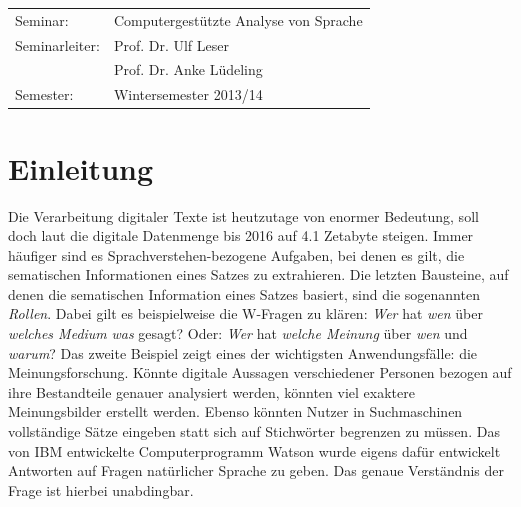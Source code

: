\documentclass[12pt]{article}
\begin{document}
\begin{center}
\begin{Large}
		\begin{table}[h]
			\Large
			\centering
			\begin{tabular}{l l}
				Seminar: & Computergestützte Analyse von Sprache\\
				Seminarleiter: & Prof. Dr. Ulf Leser\\
				 		    & Prof. Dr. Anke Lüdeling \\
				Semester: & Wintersemester 2013/14 				 	
			\end{tabular}
		\end{table}	
	\end{Large}
\end{center}


\pagestyle{fancy} %
\fancyhf{} %
\renewcommand{\headrulewidth}{0pt} %
\renewcommand{\footrulewidth}{0pt} %
\fancyfoot[C]{\thepage} %

 \newpage
 \tableofcontents
 \vspace{1cm}
 \listoffigures
 \vspace{1cm}
 \listoftables

\newpage
{}

\section{Einleitung}

Die Verarbeitung digitaler Texte ist heutzutage von enormer Bedeutung, soll doch laut \cite{gartner} die digitale Datenmenge bis 2016 auf 4.1 Zetabyte steigen. Immer häufiger sind es Sprachverstehen-bezogene Aufgaben, bei denen es gilt, die sematischen Informationen eines Satzes zu extrahieren. Die letzten Bausteine, auf denen die sematischen Information eines Satzes basiert, sind die sogenannten \textit{Rollen}. Dabei gilt es beispielweise die \glqq{}W\glqq{}-Fragen zu klären: \textit{Wer} hat \textit{wen} über \textit{welches Medium} \textit{was} gesagt? Oder: \textit{Wer} hat \textit{welche Meinung} über \textit{wen} und \textit{warum}? Das zweite Beispiel zeigt eines der wichtigsten Anwendungsfälle: die Meinungsforschung. Könnte digitale Aussagen verschiedener Personen bezogen auf ihre Bestandteile genauer analysiert werden, könnten viel exaktere Meinungsbilder erstellt werden. Ebenso könnten Nutzer in Suchmaschinen vollständige Sätze eingeben statt sich auf Stichwörter begrenzen zu müssen. Das von IBM entwickelte Computerprogramm Watson \citep{ibmWatson} wurde eigens dafür entwickelt Antworten auf Fragen natürlicher Sprache zu geben. Das genaue Verständnis der Frage ist hierbei unabdingbar.
\end{document}
